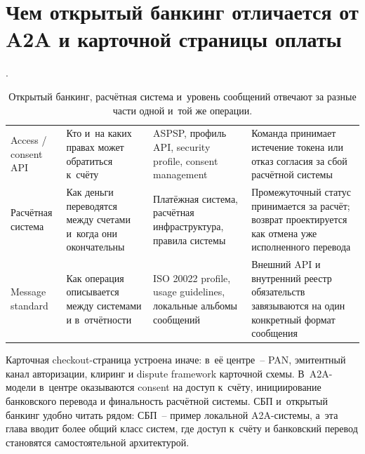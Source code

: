 \section{Чем открытый банкинг отличается от A2A и
карточной страницы оплаты}\label{sec:open-banking-boundaries}

.

\begin{table}[H]
  \begingroup
  \small
  \setlength{\tabcolsep}{4pt}
  \renewcommand{\arraystretch}{1.2}
  \begin{tabularx}{\textwidth}{
      @{}B{0.18\textwidth}
      Y
      Y
      Y@{}
    }
    \toprule
    \headrow
     &  &  &
     \\
    \midrule
    Access / consent API &
    Кто и~на каких правах может обратиться к~счёту &
    ASPSP, профиль API, security profile, consent management &
    Команда принимает истечение токена или отказ согласия за сбой
    расчётной системы \\
    Расчётная система &
    Как деньги переводятся между счетами и~когда они окончательны &
    Платёжная система, расчётная инфраструктура, правила системы &
    Промежуточный статус принимается за расчёт; возврат проектируется
    как отмена уже исполненного перевода \\
    Message standard &
    Как операция описывается между системами и в~отчётности &
    ISO 20022 profile, usage guidelines, локальные альбомы сообщений &
    Внешний API и внутренний реестр обязательств завязываются на один конкретный
    формат сообщения \\
    \bottomrule
  \end{tabularx}%
  \endgroup
  \caption{Открытый банкинг, расчётная система и~уровень сообщений отвечают за разные части
  одной и~той же операции.}\label{tab:account-based-layers}
\end{table}

Карточная checkout-страница устроена иначе: в~её центре~-- PAN,
эмитентный канал авторизации, клиринг и dispute framework карточной
схемы. В~A2A-модели в~центре оказываются consent на доступ
к~счёту, инициирование банковского перевода и финальность расчётной
системы. СБП и~открытый банкинг удобно читать рядом: СБП~-- пример
локальной A2A-системы, а~эта глава вводит более общий класс
систем, где доступ к~счёту и банковский перевод становятся
самостоятельной архитектурой.

